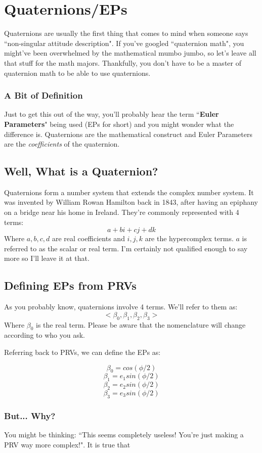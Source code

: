 \documentclass[a4paper,14pt]{extreport}
\begin{document}
\chapter{Quaternions/EPs}

Quaternions are usually the first thing that comes to mind when someone says ``non-singular attitude description". If you've googled ``quaternion math", you might've been overwhelmed by the mathematical mumbo jumbo, so let's leave all that stuff for the math majors. Thankfully, you don't have to be a master of quaternion math to be able to use quaternions.
\subsection{A Bit of Definition}
Just to get this out of the way, you'll probably hear the term ``\textbf{Euler Parameters}" being used (EPs for short) and you might wonder what the difference is. Quaternions are the mathematical construct and Euler Parameters are the \emph{coefficients} of the quaternion.\\
\section{Well, What is a Quaternion?}
Quaternions form a number system that extends the complex number system. It was invented by William Rowan Hamilton back in 1843, after having an epiphany on a bridge near his home in Ireland. They're commonly represented with 4 terms:
\[
a + bi + cj + dk
\]
Where \(a,b,c,d\) are real coefficients and \(i,j,k\) are the hypercomplex terms. \(a\) is referred to as the scalar or real term. I'm certainly not qualified enough to say more so I'll leave it at that.

\section{Defining EPs from PRVs}
As you probably know, quaternions involve 4 terms. We'll refer to them as:
\[<\beta_0,\beta_1,\beta_2,\beta_3>\]
Where $\beta_0$ is the real term. Please be aware that the nomenclature will change according to who you ask.

Referring back to PRVs, we can define the EPs as:

\[\beta_0 = cos(\phi/2)\]
\[\beta_1 = e_1 sin(\phi/2)\]
\[\beta_2 = e_2 sin(\phi/2)\]
\[\beta_3 = e_3 sin(\phi/2)\]

\subsection{But... Why?}
You might be thinking: ``This seems completely useless! You're just making a PRV way more complex!". It is true that
\end{document}
